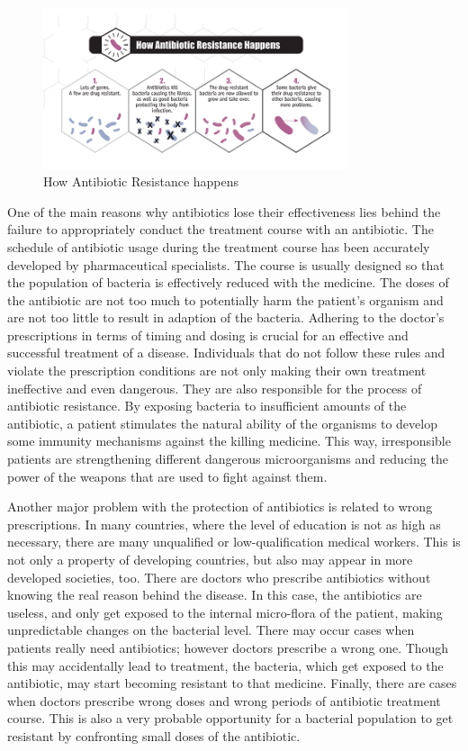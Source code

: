 \begin{figure}[H]
  \centering
  \includegraphics[width=0.8\textwidth]{img/Fig3}
  \caption{How Antibiotic Resistance happens}
  \label{fig3}
\end{figure}

One of the main reasons why antibiotics lose their effectiveness lies behind the failure to appropriately conduct the treatment course with an antibiotic. The schedule of antibiotic usage during the treatment course has been accurately developed by pharmaceutical specialists. The course is usually designed so that the population of bacteria is effectively reduced with the medicine. The doses of the antibiotic are not too much to potentially harm the patient’s organism and are not too little to result in adaption of the bacteria. Adhering to the doctor’s prescriptions in terms of timing and dosing is crucial for an effective and successful treatment of a disease. Individuals that do not follow these rules and violate the prescription conditions are not only making their own treatment ineffective and even dangerous. They are also responsible for the process of antibiotic resistance. By exposing bacteria to insufficient amounts of the antibiotic, a patient stimulates the natural ability of the organisms to develop some immunity mechanisms against the killing medicine. This way, irresponsible patients are strengthening different dangerous microorganisms and reducing the power of the weapons that are used to fight against them.

Another major problem with the protection of antibiotics is related to wrong prescriptions. In many countries, where the level of education is not as high as necessary, there are many unqualified or low-qualification medical workers. This is not only a property of developing countries, but also may appear in more developed societies, too. There are doctors who prescribe antibiotics without knowing the real reason behind the disease. In this case, the antibiotics are useless, and only get exposed to the internal micro-flora of the patient, making unpredictable changes on the bacterial level. There may occur cases when patients really need antibiotics; however doctors prescribe a wrong one. Though this may accidentally lead to treatment, the bacteria, which get exposed to the antibiotic, may start becoming resistant to that medicine. Finally, there are cases when doctors prescribe wrong doses and wrong periods of antibiotic treatment course. This is also a very probable opportunity for a bacterial population to get resistant by confronting small doses of the antibiotic.

